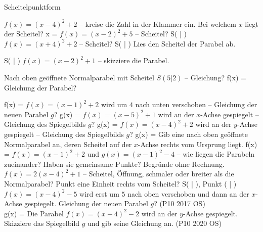 \setcounter{aufgabe}{12}

\begin{aufgabe}{Scheitelpunktform}
\begin{teile}
\teil $f(x) = (x - 4)^2 + 2$ – kreise die Zahl in der Klammer ein. Bei welchem $x$ liegt der Scheitel? x = \leerfeld
\teil $f(x) = (x - 2)^2 + 5$ – Scheitel? S( \leerfeld | \leerfeld )
\teil $f(x) = (x + 4)^2 + 2$ – Scheitel? S( \leerfeld | \leerfeld )
\teil Lies den Scheitel der Parabel ab.

\begin{ksys}[xmin=-5,xmax=1,ymin=-1,ymax=8,ablesen]
\end{ksys}
S( \leerfeld | \leerfeld )
\teil $f(x) = (x - 2)^2 + 1$ – skizziere die Parabel.

\begin{ksys}[xmin=-2,xmax=6,ymin=-1,ymax=10]
\end{ksys}
\teil Nach oben geöffnete Normalparabel mit Scheitel $S(5|2)$ – Gleichung? f(x) = \leerfeld
\teil Gleichung der Parabel?

\begin{ksys}[xmin=-1,xmax=5,ymin=-4,ymax=2,ablesen]
\end{ksys}
f(x) = \leerfeld
\teil $f(x) = (x - 1)^2 + 2$ wird um $4$ nach unten verschoben – Gleichung der neuen Parabel $g$? g(x) = \leerfeld
\teil $f(x) = (x - 5)^2 + 1$ wird an der $x$-Achse gespiegelt – Gleichung des Spiegelbilds $g$? g(x) = \leerfeld
\teil $f(x) = (x - 4)^2 + 2$ wird an der $y$-Achse gespiegelt – Gleichung des Spiegelbilds $g$? g(x) = \leerfeld
\teil Gib eine nach oben geöffnete Normalparabel an, deren Scheitel auf der $x$-Achse rechts vom Ursprung liegt. f(x) = \leerfeld
\teil $f(x) = (x - 1)^2 + 2$ und $g(x) = (x - 1)^2 - 4$ – wie liegen die Parabeln zueinander? Haben sie gemeinsame Punkte? Begründe ohne Rechnung.
\teil $f(x) = 2(x - 4)^2 + 1$ – Scheitel, Öffnung, schmaler oder breiter als die Normalparabel? Punkt eine Einheit rechts vom Scheitel? S( \leerfeld | \leerfeld ), Punkt ( \leerfeld | \leerfeld )
\teil $f(x) = (x - 4)^2 - 5$ wird erst um $5$ nach oben verschoben und dann an der $x$-Achse gespiegelt. Gleichung der neuen Parabel $g$? \hfill (P10 2017 OS) \\ g(x) = \leerfeld
\teil Die Parabel $f(x) = (x + 4)^2 - 2$ wird an der $y$-Achse gespiegelt. Skizziere das Spiegelbild $g$ und gib seine Gleichung an. \hfill (P10 2020 OS) \\


\end{teile}
\end{aufgabe}
